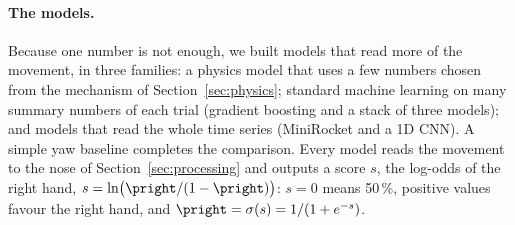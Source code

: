 \paragraph{The models.} Because one number is not enough, we built models that read more of the movement, in three
families: a physics model that uses a few numbers chosen from the mechanism of Section~\ref{sec:physics}; standard
machine learning on many summary numbers of each trial (gradient boosting and a stack of three models); and models
that read the whole time series (MiniRocket and a 1D CNN). A simple yaw baseline completes the comparison. Every model
reads the movement to the nose of Section~\ref{sec:processing} and outputs a score $s$, the log-odds of the right hand,
$s = \ln\bigl(\pright/(1-\pright)\bigr)$: $s = 0$ means 50\,\%, positive values favour the right hand, and
$\pright = \sigma(s) = 1/(1 + e^{-s})$.
